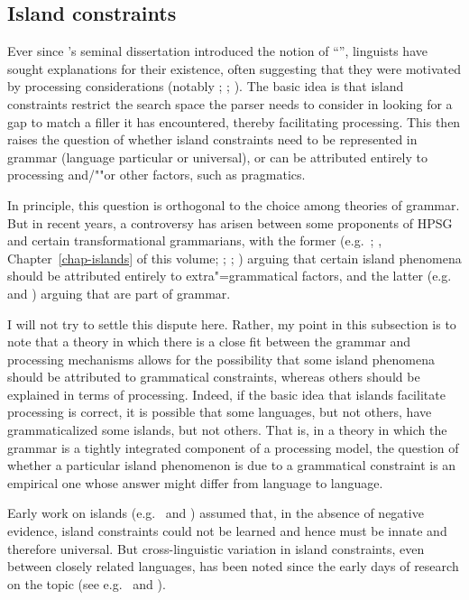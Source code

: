 \documentclass[output=paper
	        ,collection
	        ,collectionchapter
 	        ,biblatex
                ,babelshorthands
                ,newtxmath
                ,draftmode
                ,colorlinks, citecolor=brown
]{langscibook}
\begin{document}
\subsection{Island constraints}

Ever since \citeauthor{Ross67}'s seminal dissertation \citeyearpar{Ross67} introduced the notion of
``'', linguists have sought explanations for their existence, often
suggesting that they were motivated by processing considerations (notably \citealt{Grosu72-u};
\citealt{Fodor83}; \citealt{Deane91}).  The basic idea is that island constraints restrict the
search space the parser needs to consider in looking for a gap to match a filler it has encountered,
thereby facilitating processing.  This then raises the question of whether island constraints need
to be represented in grammar (language particular or universal), or can be attributed entirely to
processing and/""or other factors, such as pragmatics.

In principle, this question is orthogonal to the choice among theories of grammar.  But in recent
years, a controversy has arisen between some proponents of HPSG and certain transformational
grammarians, with the former (e.g.\ \citealp{Chaves2012}; \citeyear{chapters/islands}, Chapter~\ref{chap-islands} of this volume; \citealt{HofmeisterSag2010};
\citealt*{HofmeisterEtal2013}; ) arguing that certain island phenomena should be attributed entirely
to extra"=grammatical factors, and the latter (e.g.\ \citealt{Phillips2013} and
\citealt{SWP2012a-u}) arguing that  are part of grammar. 

I will not try to settle this dispute here.  Rather, my point in this subsection is to note that a
theory in which there is a close fit between the grammar and processing mechanisms allows for the
possibility that some island phenomena should be attributed to grammatical constraints, whereas
others should be explained in terms of processing.  Indeed, if the basic idea that islands
facilitate processing is correct, it is possible that some languages, but not others, have
grammaticalized some islands, but not others.  That is, in a theory in which the grammar is a
tightly integrated component of a processing model, the question of whether a particular island
phenomenon is due to a grammatical constraint is an empirical one whose answer might differ from
language to language.  

Early work on islands (e.g.\ \citealt{Ross67} and \citealt{Chomsky73a}) assumed that, in the absence
of negative evidence, island constraints could not be learned and hence must be innate and therefore
universal.  But cross-linguistic variation in island constraints, even between closely related
languages, has been noted since the early days of research on the topic (see e.g.\
\citealt{Erteschik73a-u} and \citealt{EngdahlEjerhed82}\addpages). 
\end{document}
